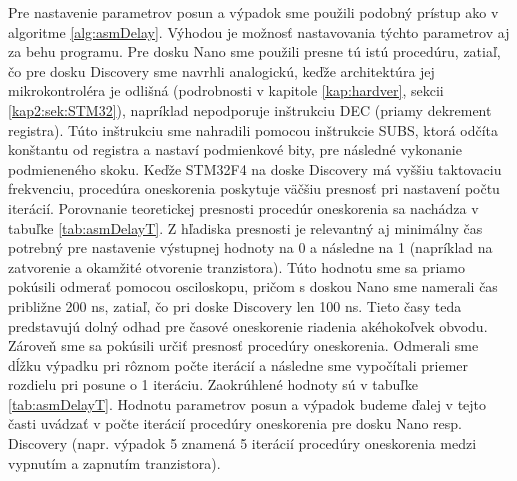 Pre nastavenie parametrov posun a výpadok sme použili podobný prístup ako v algoritme \ref{alg:asmDelay}. Výhodou je možnosť nastavovania týchto parametrov aj za behu programu. Pre dosku Nano sme použili presne tú istú procedúru, zatiaľ, čo pre dosku Discovery sme navrhli analogickú, keďže architektúra jej mikrokontroléra je odlišná (podrobnosti v kapitole \ref{kap:hardver}, sekcii \ref{kap2:sek:STM32}), napríklad nepodporuje inštrukciu DEC (priamy dekrement registra). Túto inštrukciu sme nahradili pomocou inštrukcie SUBS, ktorá odčíta konštantu od registra a nastaví podmienkové bity, pre následné vykonanie podmieneného skoku. Keďže STM32F4 na doske Discovery má vyššiu taktovaciu frekvenciu, procedúra oneskorenia poskytuje väčšiu presnosť pri nastavení počtu iterácií. Porovnanie teoretickej presnosti procedúr oneskorenia sa nachádza v tabuľke \ref{tab:asmDelayT}. Z hľadiska presnosti je relevantný aj minimálny čas potrebný pre nastavenie výstupnej hodnoty na 0 a následne na 1 (napríklad na zatvorenie a okamžité otvorenie tranzistora). Túto hodnotu sme sa priamo pokúsili odmerať pomocou osciloskopu, pričom s doskou Nano sme namerali čas približne 200 ns, zatiaľ, čo pri doske Discovery len 100 ns. Tieto časy teda predstavujú dolný odhad pre časové oneskorenie riadenia akéhokoľvek obvodu. Zároveň sme sa pokúsili určiť presnosť procedúry oneskorenia. Odmerali sme dĺžku výpadku pri rôznom počte iterácií a následne sme vypočítali priemer rozdielu pri posune o 1 iteráciu. Zaokrúhlené hodnoty sú v tabuľke \ref{tab:asmDelayT}. Hodnotu parametrov posun a výpadok budeme ďalej v tejto časti uvádzať v počte iterácií procedúry oneskorenia pre dosku Nano resp. Discovery (napr. výpadok 5 znamená 5 iterácií procedúry oneskorenia medzi vypnutím a zapnutím tranzistora).

